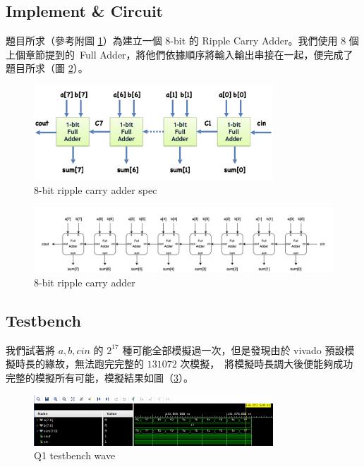 \documentclass[10.5pt,compsoc,UTF8]{CjC}
\theoremstyle{mystyle}
\begin{document}
\subsection{Implement \& Circuit}

題目所求（參考附圖 \ref{fig:Q1_spec}）為建立一個 8-bit 的 Ripple Carry Adder。我們使用 8 個上個章節提到的\
Full Adder，將他們依據順序將輸入輸出串接在一起，便完成了題目所求（圖 \ref{fig:Q1_circuit}）。

\begin{figure}[htp]
  \centering
  \includegraphics[width=0.8\textwidth]{Q1_spec.png}
  \caption{8-bit ripple carry adder spec}
  \label{fig:Q1_spec}
\end{figure}

\begin{figure}[htp]
  \centering
  \includegraphics[width=\textwidth]{Adders.png} 
  \caption{8-bit ripple carry adder}
  \label{fig:Q1_circuit} 
\end{figure}



\subsection{Testbench}
\label{sec:Q1_testbench}
我們試著將 $a, b, cin$ 的 $2^{17}$ 種可能全部模擬過一次，但是發現由於 vivado 預設模擬時長的緣故，無法跑完完整的 $131072$ 次模擬，\
將模擬時長調大後便能夠成功完整的模擬所有可能，模擬結果如圖（\ref{fig:Q1_wave}）。

\begin{figure}[h]
  \centering
  \includegraphics[width=0.8\textwidth]{Q1-wave.png}
  \caption{Q1 testbench wave}
  \label{fig:Q1_wave}
\end{figure}
\end{document}
